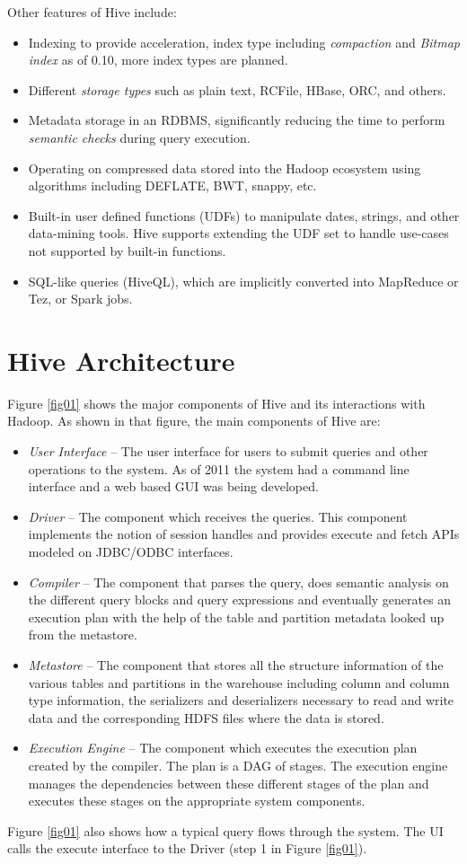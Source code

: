 \documentclass[twocolumn]{article}
\newcommand{\bi}{\begin{itemize}}
\newcommand{\ei}{\end{itemize}}
\newcommand{\ii}{\item}
\begin{document}
Other features of Hive include:
\bi
\ii Indexing to provide acceleration, index type including \textit{compaction} and \textit{Bitmap index} as of 0.10, more index types are planned.
\ii Different \textit{storage types} such as plain text, RCFile, HBase, ORC, and others.
\ii Metadata storage in an RDBMS, significantly reducing the time to perform \textit{semantic checks} during query execution.
\ii Operating on compressed data stored into the Hadoop ecosystem using algorithms including DEFLATE, BWT, snappy, etc.
\ii Built-in user defined functions (UDFs) to manipulate dates, strings, and other data-mining tools. Hive supports extending the UDF set to handle use-cases not supported by built-in functions.
\ii SQL-like queries (HiveQL), which are implicitly converted into MapReduce or Tez, or Spark jobs.
\ei

\section{Hive Architecture}
Figure \ref{fig01} shows the major components of Hive and its interactions with Hadoop. As shown in that figure, the main components of Hive are:
\bi
\ii \textit{User Interface} – The user interface for users to submit queries and other operations to the system. As of 2011 the system had a command line interface and a web based GUI was being developed.
\ii \textit{Driver} – The component which receives the queries. This component implements the notion of session handles and provides execute and fetch APIs modeled on JDBC/ODBC interfaces.
\ii \textit{Compiler} – The component that parses the query, does semantic analysis on the different query blocks and query expressions and eventually generates an execution plan with the help of the table and partition metadata looked up from the metastore.
\ii \textit{Metastore} – The component that stores all the structure information of the various tables and partitions in the warehouse including column and column type information, the serializers and deserializers necessary to read and write data and the corresponding HDFS files where the data is stored.
\ii \textit{Execution Engine} – The component which executes the execution plan created by the compiler. The plan is a DAG of stages. The execution engine manages the dependencies between these different stages of the plan and executes these stages on the appropriate system components.
\ei
Figure \ref{fig01} also shows how a typical query flows through the system. The UI calls the execute interface to the Driver (step 1 in Figure \ref{fig01}). 
\end{document}
